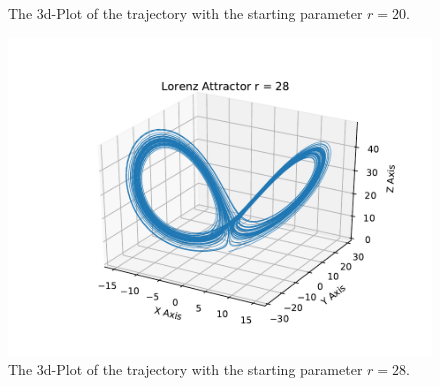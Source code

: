 \begin{itemize}
\begin{itemize}
\begin{figure}
                        \caption{The 3d-Plot of the trajectory with the starting parameter $r=20$.}
                    \end{figure}
                    \begin{figure}
                        \includegraphics[width=\textwidth]{images/Lorentz_r_28_3d.pdf}
                        \caption{The 3d-Plot of the trajectory with the starting parameter $r=28$.}
                    \end{figure}
            \end{itemize}
\end{itemize}              